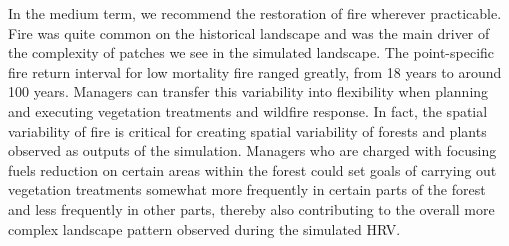 In the medium term, we recommend the restoration of fire wherever practicable. Fire was quite common on the historical landscape and was the main driver of the complexity of patches we see in the simulated landscape. The point-specific fire return interval for low mortality fire ranged greatly, from 18 years to around 100 years. Managers can transfer this variability into flexibility when planning and executing vegetation treatments and wildfire response. In fact, the spatial variability of fire is critical for creating spatial variability of forests and plants observed as outputs of the simulation. Managers who are charged with focusing fuels reduction on certain areas within the forest could set goals of carrying out vegetation treatments somewhat more frequently in certain parts of the forest and less frequently in other parts, thereby also contributing to the overall more complex landscape pattern observed during the simulated HRV. 

